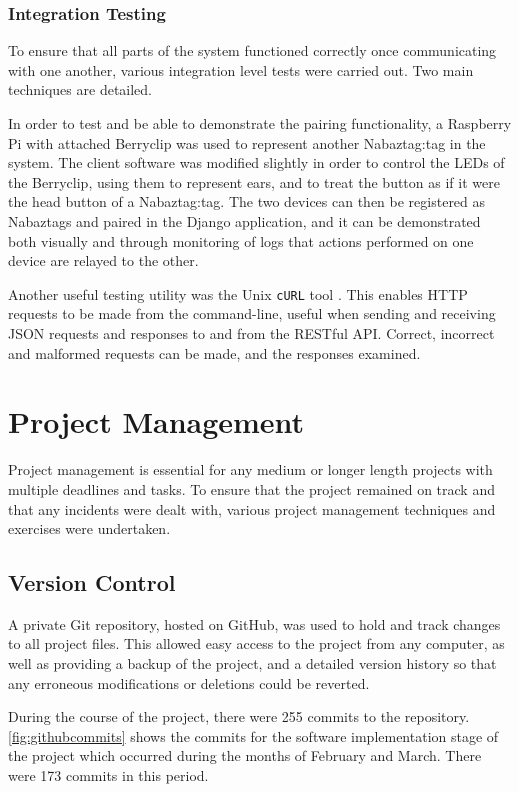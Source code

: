 \documentclass[12pt, a4paper]{article}
\begin{document}
	\subsubsection{Integration Testing}
	
	To ensure that all parts of the system functioned correctly once communicating with one another, various integration level tests were carried out. Two main techniques are detailed.
	
	In order to test and be able to demonstrate the pairing functionality, a Raspberry Pi \parencite{raspberrypi} with attached Berryclip \parencite{berryclip} was used to represent another Nabaztag:tag in the system. The client software was modified slightly in order to control the \acp{LED} of the Berryclip, using them to represent ears, and to treat the button as if it were the head button of a Nabaztag:tag. The two devices can then be registered as Nabaztags and paired in the Django application, and it can be demonstrated both visually and through monitoring of logs that actions performed on one device are relayed to the other.
	
	Another useful testing utility was the Unix \verb+cURL+ tool \parencite{curl}. This enables \ac{HTTP} requests to be made from the command-line, useful when sending and receiving \ac{JSON} requests and responses to and from the \ac{REST}ful \ac{API}. Correct, incorrect and malformed requests can be made, and the responses examined.		
					
	\section{Project Management}
		Project management is essential for any medium or longer length projects with multiple deadlines and tasks. To ensure that the project remained on track and that any incidents were dealt with, various project management techniques and exercises were undertaken.
		
		\subsection{Version Control}
			A private Git repository, hosted on GitHub, was used to hold and track changes to all project files. This allowed easy access to the project from any computer, as well as providing a backup of the project, and a detailed version history so that any erroneous modifications or deletions could be reverted.
			
			During the course of the project, there were 255 commits to the repository. \autoref{fig:githubcommits} shows the commits for the software implementation stage of the project which occurred during the months of February and March. There were 173 commits in this period.
			
\end{document}
